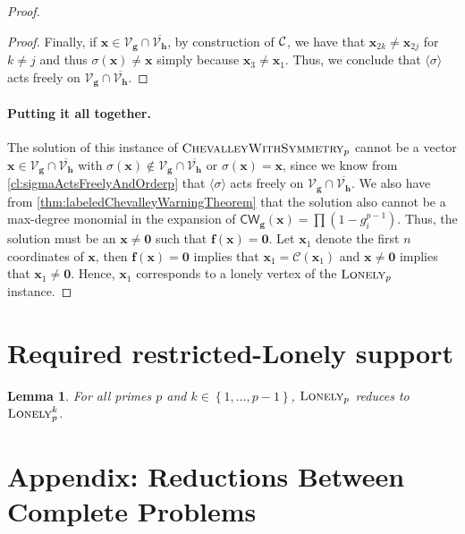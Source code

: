\documentclass[10pt,a4paper]{article}
\newtheorem{lemma}[theorem]{Lemma}
\theoremstyle{definition}
\theoremstyle{remark}
\let\boldm\bm
\newcommand{\bx}{{\boldm x}}
\def\a#1{\langle#1\rangle}
\def\set#1{\left\{#1\right\}}
\newcommand{\calC}{\mathcal{C}}
\newcommand{\calV}{\mathcal{V}}
\renewcommand{\vec}[1]{\boldsymbol{#1}}
\newcommand{\vecf}{\ensuremath{\boldsymbol{f}}}
\newcommand{\vecg}{\ensuremath{\boldsymbol{g}}}
\newcommand{\vech}{\ensuremath{\boldsymbol{h}}}
\newcommand{\vecx}{\ensuremath{\boldsymbol{x}}}
\newcommand{\pnum}{p}
\newcommand{\lonelyp}{\ensuremath\textsc{Lonely}_{\pnum}}
\newcommand{\lonely}{\ensuremath\textsc{Lonely}}
\newcommand{\cChevalleyp}{\textsc{ChevalleyWithSymmetry}_{\pnum}}
\newcommand{\CW}{\mathsf{CW}}
\begin{document}
\begin{proof}
\begin{proof}
              Finally, if $\vecx \in \calV_{\vecg} \cap
              \overline{\calV_{\vech}}$, by
              construction of $\cal{C}$, we have that $\vecx_{2k} \neq \vecx_{2j}$ for
              $k\neq j$ and thus $\sigma(\vecx) \ne \vecx$ simply because $\vecx_3 \ne \vecx_1$. Thus, we conclude that $\a{\sigma}$ acts freely on
              $\calV_{\vecg} \cap \overline{\calV_{\vech}}$.
          \end{proof}

        		\paragraph{Putting it all together.} The solution of this instance of $\cChevalleyp$ cannot be a vector
                $\vecx \in \calV_{\vecg} \cap \overline{\calV_{\vech}}$  with
                $\sigma(\vecx)
                \not\in \calV_{\vecg} \cap \overline{\calV_{\vech}}$ or
                $\sigma(\vecx) = \vecx$, since we know from
                \autoref{cl:sigmaActsFreelyAndOrderp} that $\a{\sigma}$ acts freely on
                $\calV_{\vecg} \cap \overline{\calV_{\vech}}$.
                We also have from \autoref{thm:labeledChevalleyWarningTheorem} that the solution also cannot be a max-degree monomial in the expansion of $\CW_{\vecg}(\bx) = \prod (1-g_i^{p-1})$.
                Thus, the solution must be an $\vecx \neq \vec{0}$ such that
                $\vecf(\vecx) = \vec{0}$. Let $\vecx_1$ denote the first $n$
                coordinates of $\vecx$, then $\vecf(\vecx) = \vec{0}$ implies that
                $\vecx_1 = \calC(\vecx_1)$ and $\vecx \neq \vec{0}$ implies that
                $\vecx_1 \neq \vec{0}$. Hence, $\vecx_1$ corresponds to
                a lonely vertex of the $\lonelyp$ instance.
\end{proof} 

\section*{Required restricted-Lonely support}
\setcounter{theorem}{43}
\begin{lemma}\label{lem:restricted-lonely}
	For all primes $p$ and $k \in \set{1, \ldots, p-1}$, $\lonely_p$ reduces to $\lonely_p^k$.
\end{lemma}

\appendix
\setcounter{section}{0}
\setcounter{theorem}{46}
\section{Appendix: Reductions Between Complete Problems}
\label{sec:equivalences}
\end{document}
